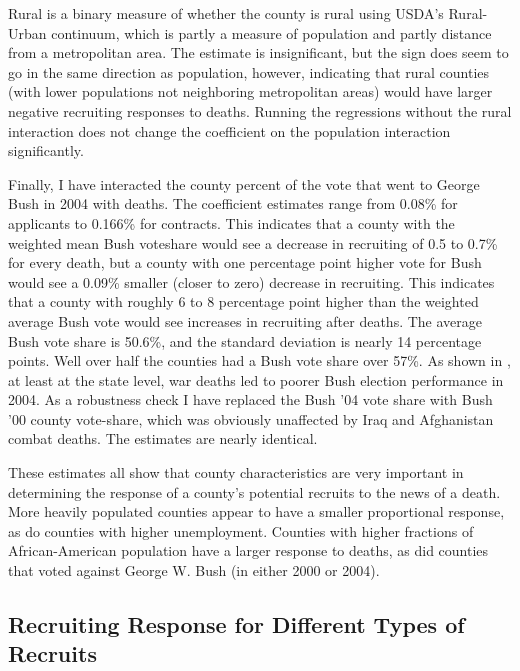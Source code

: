 \documentclass[12pt] {article}
\begin{document}
Rural is a binary measure of whether the county is rural using USDA's Rural-Urban continuum, which is partly a measure of population and partly distance from a metropolitan area. The estimate is insignificant, but the sign does seem to go in the same direction as population, however, indicating that rural counties
(with lower populations not neighboring metropolitan areas) would have larger negative recruiting responses
to deaths. Running the regressions without the rural interaction does
not change the coefficient on the population interaction significantly.

Finally, I have interacted the county percent of the vote that went
to George Bush in 2004 with deaths. The coefficient estimates range
from 0.08\% for applicants to 0.166\% for contracts. This indicates
that a county with the weighted mean Bush voteshare would see a decrease
in recruiting of 0.5 to 0.7\% for every death, but a county with one
percentage point higher vote for Bush would see a 0.09\% smaller (closer
to zero) decrease in recruiting. This indicates that a county with
roughly 6 to 8 percentage point higher than the weighted average Bush
vote would see increases in recruiting after deaths. The average Bush
vote share is 50.6\%, and the standard deviation is nearly 14 percentage
points. Well over half the counties had a Bush vote share over 57\%.
As shown in \cite{Ted-Miguel-Bush-Deaths}, at least at the state
level, war deaths led to poorer Bush election performance in 2004.
As a robustness check I have replaced the Bush '04 vote share with
Bush '00 county vote-share, which was obviously unaffected by Iraq
and Afghanistan combat deaths. The estimates are nearly identical. 

These estimates all show that county characteristics are very important
in determining the response of a county's potential recruits to the
news of a death. More heavily populated counties appear to have a
smaller proportional response, as do counties with higher unemployment.
Counties with higher fractions of African-American population have
a larger response to deaths, as did counties that voted against George
W. Bush (in either 2000 or 2004).


\subsection{Recruiting Response for Different Types of Recruits \label{sub:Different Recruit Types}}
\end{document}
